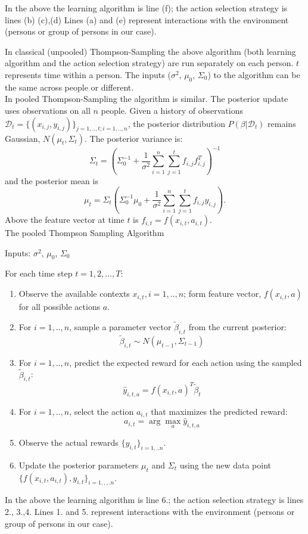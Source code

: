 \documentclass{article}
\begin{document}
In the above the learning algorithm is line (f); the action selection strategy is lines (b) (c),(d)
Lines (a) and (e)  represent interactions with the environment (persons or group of persons in our case).





In classical (unpooled) Thompson-Sampling the above algorithm (both learning algorithm and the action selection strategy) are run separately on each person.   $t$ represents time within a person.  The inputs ($\sigma^2$, $\mu_0$, $\Sigma_0$) to the algorithm can be the same across people or different. \\

In pooled Thompson-Sampling the algorithm is similar.  The posterior update uses observations on all $n$ people. Given a history of observations $\mathcal{D}_t = \{(x_{i,j}, y_{i,j})\}_{j=1,..,t; i=1,..,n}$, the posterior distribution $P(\beta | \mathcal{D}_t)$ remains Gaussian, $N(\mu_t, \Sigma_t)$.  
The posterior variance is:
$$\Sigma_t = (\Sigma_0^{-1} + \frac{1}{\sigma^2} \sum_{i=1}^n\sum_{j=1}^t f_{i,j} f_{i,j}^T)^{-1}$$
and the posterior mean is
$$\mu_t = \Sigma_t (\Sigma_0^{-1} \mu_0 + \frac{1}{\sigma^2} \sum_{i=1}^n\sum_{j=1}^t f_{i,j} y_{i,j}).$$
Above the feature vector at time $t$ is $f_{i,t}=f(x_{i,t}, a_{i,t})$.\\

 The pooled Thompson Sampling Algorithm

\noindent Inputs:  $\sigma^2$, $\mu_0$, $\Sigma_0$

\noindent For each time step $t = 1, 2, \dots, T$:
\begin{enumerate}
    \item Observe the available contexts $x_{i, t}, i=1,..,n$; form feature vector, $f({ x_{i, t}, a})$ for all possible actions $a$.
    \item For $ i=1,..,n$, sample a parameter vector $\tilde{\beta}_{i,t}$ from the current posterior:
$$\tilde{\beta}_{i,t} \sim N(\mu_{t-1}, \Sigma_{t-1})$$
\item For $ i=1,..,n$, predict the expected reward for each action using the sampled $\tilde{\beta}_{i,t}$:
$$\hat{y}_{i,t, a} = f({ x_{i, t}, a})^T \tilde{\beta}_t$$
\item For $ i=1,..,n$, select the action $a_{i,t}$ that maximizes the predicted reward:
$$a_{i,t} = \arg\max_a \hat{y}_{i,t, a}$$
\item Observe the actual rewards $\{y_{i,t}\}_{i=1,..n}$.
\item Update the posterior parameters $\mu_t$ and $\Sigma_t$ using the new data point $\{f({ x_{i, t}, a_{i, t}}), y_{i, t}\}_{i=1,,,.n}$.
\end{enumerate}
In the above the learning algorithm is line 6.; the action selection strategy is lines 2., 3.,4.
Lines 1. and 5.  represent interactions with the environment (persons or group of persons in our case).
\end{document}
